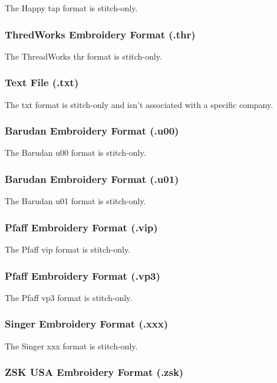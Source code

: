 \documentclass[a4paper, 11pt]{report}
\begin{document}
The Happy tap format is stitch-only.

\subsubsection{ThredWorks Embroidery Format (.thr)}

The ThreadWorks thr format is stitch-only.

\subsubsection{Text File (.txt)}

The txt format is stitch-only and isn't associated with a specific company.

\subsubsection{Barudan Embroidery Format (.u00)}

The Barudan u00 format is stitch-only.

\subsubsection{Barudan Embroidery Format (.u01)}

The Barudan u01 format is stitch-only.

\subsubsection{Pfaff Embroidery Format (.vip)}

The Pfaff vip format is stitch-only.

\subsubsection{Pfaff Embroidery Format (.vp3)}

The Pfaff vp3 format is stitch-only.

\subsubsection{Singer Embroidery Format (.xxx)}

The Singer xxx format is stitch-only.

\subsubsection{ZSK USA Embroidery Format (.zsk)}
\end{document}
